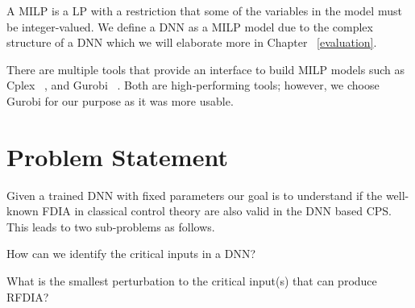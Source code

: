 A \ac{MILP} is a \ac{LP} with a restriction that some of the variables in the model must be integer-valued. 
We define a \ac{DNN} as a \ac{MILP} model due to the complex structure of a \ac{DNN} which we will elaborate more in Chapter ~\ref{evaluation}. 

There are multiple tools that provide an interface to build \ac{MILP} models such as Cplex ~\cite{cplex}, and Gurobi ~\cite{gurobi}.
Both are high-performing tools; however, we choose Gurobi for our purpose as it was more usable. 



\section{Problem Statement}
\label{problemstatement}

Given a trained DNN with fixed parameters our goal is to understand if the well-known \ac*{FDIA} in classical control theory are also valid in the DNN based CPS.  
This leads to two sub-problems as follows.

\begin{problem}
	How can we identify the critical inputs in a DNN?
\end{problem}

\begin{problem}
	What is the smallest perturbation to the critical input(s) that can produce \ac{RFDIA}?
\end{problem}




